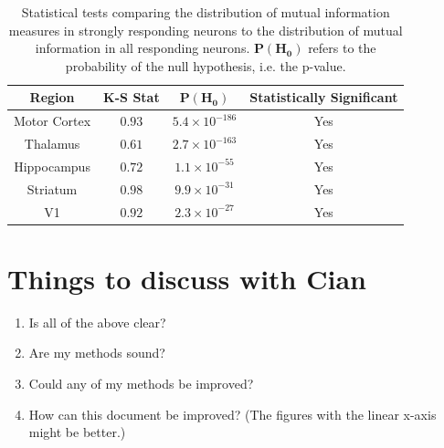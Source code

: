 \documentclass[a4paper,12pt]{article}
\theoremstyle{definition}
\begin{document}
\begin{table}[ht!]
  \begin{center}
    \caption{Statistical tests comparing the distribution of mutual information measures in strongly responding neurons to the distribution of mutual information in all responding neurons. $\mathbf{P(H_0)}$ refers to the probability of the null hypothesis, i.e. the p-value.}
    \label{tab:strong_info_ks_test}
    \begin{tabular}{c|c|c|c} %
      \textbf{Region} & \textbf{K-S Stat} & $\mathbf{P(H_0)}$ & \textbf{Statistically Significant}\\
      \hline
      Motor Cortex  & $0.93$  & $5.4 \times 10^{-186}$  & Yes \\
      Thalamus      & $0.61$  & $2.7 \times 10^{-163}$  & Yes \\
      Hippocampus   & $0.72$  & $1.1 \times 10^{-55}$   & Yes \\
      Striatum      & $0.98$  & $9.9 \times 10^{-31}$   & Yes \\
      V1            & $0.92$  & $2.3 \times 10^{-27}$   & Yes \\
    \end{tabular}
  \end{center}
\end{table}

\section*{Things to discuss with Cian}
\begin{enumerate}
  \item Is all of the above clear?
  \item Are my methods sound?
  \item Could any of my methods be improved?
  \item How can this document be improved? (The figures with the linear x-axis might be better.)
\end{enumerate}


\newpage


\end{document}

